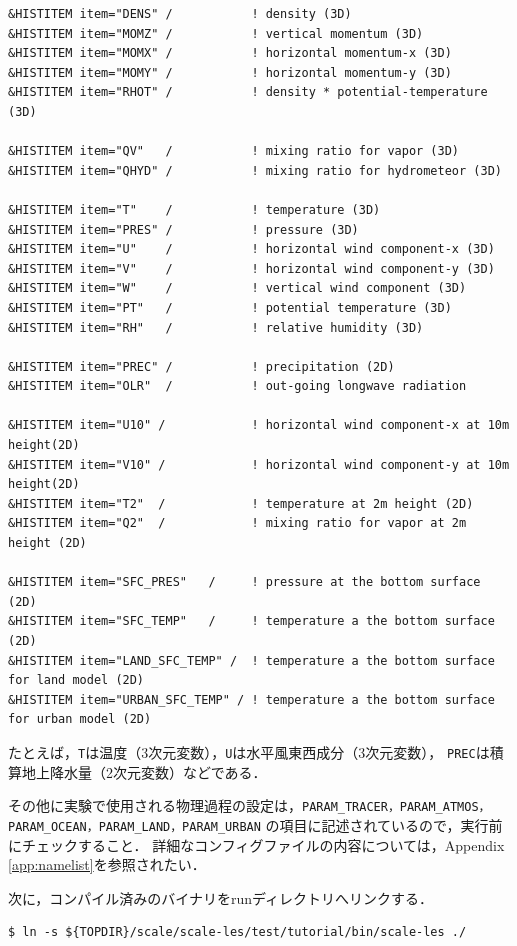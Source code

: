 \begin{verbatim}
&HISTITEM item="DENS" /           ! density (3D)
&HISTITEM item="MOMZ" /           ! vertical momentum (3D)
&HISTITEM item="MOMX" /           ! horizontal momentum-x (3D)
&HISTITEM item="MOMY" /           ! horizontal momentum-y (3D)
&HISTITEM item="RHOT" /           ! density * potential-temperature (3D)

&HISTITEM item="QV"   /           ! mixing ratio for vapor (3D)
&HISTITEM item="QHYD" /           ! mixing ratio for hydrometeor (3D)

&HISTITEM item="T"    /           ! temperature (3D)
&HISTITEM item="PRES" /           ! pressure (3D)
&HISTITEM item="U"    /           ! horizontal wind component-x (3D)
&HISTITEM item="V"    /           ! horizontal wind component-y (3D)
&HISTITEM item="W"    /           ! vertical wind component (3D)
&HISTITEM item="PT"   /           ! potential temperature (3D)
&HISTITEM item="RH"   /           ! relative humidity (3D)

&HISTITEM item="PREC" /           ! precipitation (2D)
&HISTITEM item="OLR"  /           ! out-going longwave radiation

&HISTITEM item="U10" /            ! horizontal wind component-x at 10m height(2D)
&HISTITEM item="V10" /            ! horizontal wind component-y at 10m height(2D)
&HISTITEM item="T2"  /            ! temperature at 2m height (2D)
&HISTITEM item="Q2"  /            ! mixing ratio for vapor at 2m height (2D)

&HISTITEM item="SFC_PRES"   /     ! pressure at the bottom surface (2D)
&HISTITEM item="SFC_TEMP"   /     ! temperature a the bottom surface (2D)
&HISTITEM item="LAND_SFC_TEMP" /  ! temperature a the bottom surface for land model (2D)
&HISTITEM item="URBAN_SFC_TEMP" / ! temperature a the bottom surface for urban model (2D)

\end{verbatim}

たとえば，\verb|T|は温度（3次元変数），\verb|U|は水平風東西成分（3次元変数），
\verb|PREC|は積算地上降水量（2次元変数）などである．


その他に実験で使用される物理過程の設定は，\verb|PARAM_TRACER，PARAM_ATMOS，PARAM_OCEAN，PARAM_LAND，PARAM_URBAN|
の項目に記述されているので，実行前にチェックすること．
詳細なコンフィグファイルの内容については，Appendix \ref{app:namelist}を参照されたい．


次に，コンパイル済みのバイナリをrunディレクトリへリンクする．

\begin{verbatim}
$ ln -s ${TOPDIR}/scale/scale-les/test/tutorial/bin/scale-les ./
\end{verbatim}

